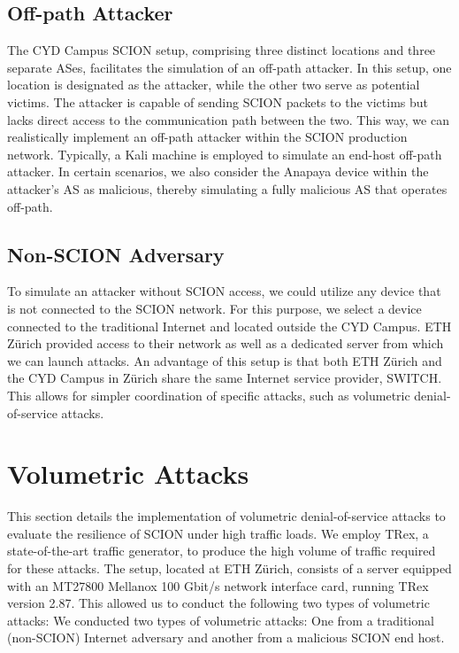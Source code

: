 \subsection{Off-path Attacker}

The CYD Campus SCION setup, comprising three distinct locations and three separate ASes, facilitates the simulation of an off-path attacker.
In this setup, one location is designated as the attacker, while the other two serve as potential victims.
The attacker is capable of sending SCION packets to the victims but lacks direct access to the communication path between the two.
This way, we can realistically implement an off-path attacker within the SCION production network.
Typically, a Kali machine is employed to simulate an end-host off-path attacker.
In certain scenarios, we also consider the Anapaya device within the attacker's AS as malicious, thereby simulating a fully malicious AS that operates off-path.

\subsection{Non-SCION Adversary}
To simulate an attacker without SCION access, we could utilize any device that is not connected to the SCION network.
For this purpose, we select a device connected to the traditional Internet and located outside the CYD Campus.
ETH Zürich provided access to their network as well as a dedicated server from which we can launch attacks.
An advantage of this setup is that both ETH Zürich and the CYD Campus in Zürich share the same Internet service provider, SWITCH.
This allows for simpler coordination of specific attacks, such as volumetric denial-of-service attacks.


\section{Volumetric Attacks}
\label{sec:impl:VolumetricDoS}
This section details the implementation of volumetric denial-of-service attacks to evaluate the resilience of SCION under high traffic loads.
We employ TRex, a state-of-the-art traffic generator, to produce the high volume of traffic required for these attacks.
The setup, located at ETH Zürich, consists of a server equipped with an MT27800 Mellanox 100 Gbit/s network interface card, running TRex version 2.87.
This allowed us to conduct the following two types of volumetric attacks:
We conducted two types of volumetric attacks:
One from a traditional (non-SCION) Internet adversary and another from a malicious SCION end host.

